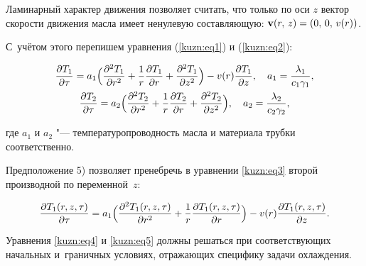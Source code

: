 Ламинарный характер движения позволяет считать, что только по оси $z$ вектор скорости движения масла имеет ненулевую составляющую: ${\rm \bf{v}}(r,\,z) = (0,\, 0,\,v(r))$. 

С~учётом этого перепишем уравнения (\ref{kuzn:eq1}) и (\ref{kuzn:eq2}):

\begin{gather}

\label{kuzn:eq3}

\frac{\partial T_1}{\partial \tau}=a_1 \Bigl(\frac{\partial^2 T_1}{\partial r^2}+\frac{1}{r}\frac{\partial T_1}{\partial r}+\frac{\partial

^2 T_1}{\partial z^2} \Bigr)-v(r)\frac{\partial T_1

}{\partial z}, \quad a_1 =\frac{\lambda_1}{c_1 \gamma_1},\\

\label{kuzn:eq4}

\frac{\partial T_2}{\partial \tau }=a_2 \Bigl(

\frac{\partial^2 T_2}{\partial r^2}+\frac{1}{r}\frac{\partial T_2}{\partial r}+\frac{\partial

^2 T_2}{\partial z^2}\Bigr), \quad a_2 =\frac{\lambda

_2}{c_2 \gamma _2},

\end{gather}

где $a_1$ и $a_2$ "--- температуропроводность масла и материала трубки соответственно.





Предположение 5) позволяет пренебречь в уравнении \eqref{kuzn:eq3} второй производной по переменной~$z$: 

\begin{equation}

\label{kuzn:eq5}

\frac{\partial T_1 (r,z,\tau )}{\partial \tau

}=a_1 \Bigl( \frac{\partial^2 T_1 (r,z,\tau )}{\partial

r^2}+\frac{1}{r}\frac{\partial T_1 (r,z,\tau )}{\partial r}\Bigr)

-v(r)\frac{\partial T_1 (r,z,\tau )}{\partial z}.

\end{equation}



Уравнения \eqref{kuzn:eq4} и \eqref{kuzn:eq5} должны решаться при соответствующих начальных и~граничных условиях, отражающих специфику задачи охлаждения.



